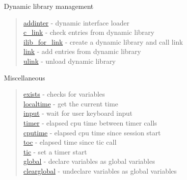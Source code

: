 Dynamic library management
\begin{quote}
\noindent 
\hyperlink{addinter}{addinter} - dynamic interface loader\\
\hyperlink{c_link}{c\_link} - check entries from dynamic library \\
\hyperlink{ilib_for_link}{ilib\_for\_link} - create a dynamic library and call link \\
\hyperlink{link}{link} - add entries from dynamic library \\
\hyperlink{ulink}{ulink} - unload dynamic library \\
\end{quote}

Miscellaneous 
\begin{quote}
\noindent 
\hyperlink{exists}{exists} - {checks for variables}\\
\hyperlink{localtime}{localtime} - {get the current time}\\
\hyperlink{input}{input} - {wait for user keyboard input} \\
\hyperlink{timer}{timer} - {elapsed cpu time between timer calls} \\
\hyperlink{cputime}{cputime} - {elapsed cpu time since session start} \\
\hyperlink{toc}{toc} - {elapsed time since tic call}\\
\hyperlink{tic}{tic} - {set a timer start}\\
\hyperlink{global}{global} - {declare variables as global variables} \\
\hyperlink{clearglobal}{clearglobal} - {undeclare variables as global variables} \\
\end{quote}






 
  
  

 

 
 

 
 
 
 
 
